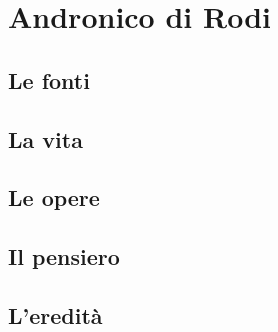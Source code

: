 \chapter{Andronico di Rodi}

\section{Le fonti}

\section{La vita}

\section{Le opere}

\section{Il pensiero}

\section{L'eredità}
